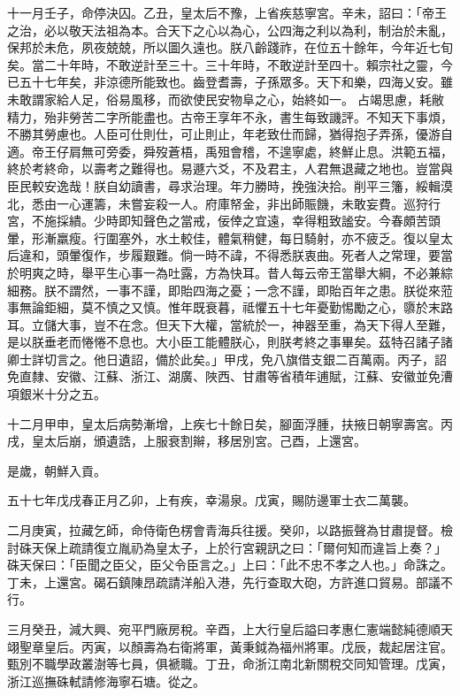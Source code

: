 \begin{pinyinscope}
十一月壬子，命停決囚。乙丑，皇太后不豫，上省疾慈寧宮。辛未，詔曰：「帝王之治，必以敬天法祖為本。合天下之心以為心，公四海之利以為利，制治於未亂，保邦於未危，夙夜兢兢，所以圖久遠也。朕八齡踐祚，在位五十餘年，今年近七旬矣。當二十年時，不敢逆計至三十。三十年時，不敢逆計至四十。賴宗社之靈，今已五十七年矣，非涼德所能致也。齒登耆壽，子孫眾多。天下和樂，四海乂安。雖未敢謂家給人足，俗易風移，而欲使民安物阜之心，始終如一。占竭思慮，耗敝精力，殆非勞苦二字所能盡也。古帝王享年不永，書生每致譏評。不知天下事煩，不勝其勞慮也。人臣可仕則仕，可止則止，年老致仕而歸，猶得抱子弄孫，優游自適。帝王仔肩無可旁委，舜歿蒼梧，禹殂會稽，不遑寧處，終鮮止息。洪範五福，終於考終命，以壽考之難得也。易遯六爻，不及君主，人君無退藏之地也。豈當與臣民較安逸哉！朕自幼讀書，尋求治理。年力勝時，挽強決拾。削平三籓，綏輯漠北，悉由一心運籌，未嘗妄殺一人。府庫帑金，非出師賑饑，未敢妄費。巡狩行宮，不施採繢。少時即知聲色之當戒，佞倖之宜遠，幸得粗致謐安。今春頗苦頭暈，形漸羸瘦。行圍塞外，水土較佳，體氣稍健，每日騎射，亦不疲乏。復以皇太后違和，頭暈復作，步履艱難。倘一時不諱，不得悉朕衷曲。死者人之常理，要當於明爽之時，舉平生心事一為吐露，方為快耳。昔人每云帝王當舉大綱，不必兼綜細務。朕不謂然，一事不謹，即貽四海之憂；一念不謹，即貽百年之患。朕從來蒞事無論鉅細，莫不慎之又慎。惟年既衰暮，祗懼五十七年憂勤惕勵之心，隳於末路耳。立儲大事，豈不在念。但天下大權，當統於一，神器至重，為天下得人至難，是以朕垂老而惓惓不息也。大小臣工能體朕心，則朕考終之事畢矣。茲特召諸子諸卿士詳切言之。他日遺詔，備於此矣。」甲戌，免八旗借支銀二百萬兩。丙子，詔免直隸、安徽、江蘇、浙江、湖廣、陜西、甘肅等省積年逋賦，江蘇、安徽並免漕項銀米十分之五。

十二月甲申，皇太后病勢漸增，上疾七十餘日矣，腳面浮腫，扶掖日朝寧壽宮。丙戌，皇太后崩，頒遺誥，上服衰割辮，移居別宮。己酉，上還宮。

是歲，朝鮮入貢。

五十七年戊戌春正月乙卯，上有疾，幸湯泉。戊寅，賜防邊軍士衣二萬襲。

二月庚寅，拉藏乞師，命侍衛色楞會青海兵往援。癸卯，以路振聲為甘肅提督。檢討硃天保上疏請復立胤礽為皇太子，上於行宮親訊之曰：「爾何知而違旨上奏？」硃天保曰：「臣聞之臣父，臣父令臣言之。」上曰：「此不忠不孝之人也。」命誅之。丁未，上還宮。碣石鎮陳昂疏請洋船入港，先行查取大砲，方許進口貿易。部議不行。

三月癸丑，減大興、宛平門廠房稅。辛酉，上大行皇后謚曰孝惠仁憲端懿純德順天翊聖章皇后。丙寅，以顏壽為右衛將軍，黃秉鉞為福州將軍。戊辰，裁起居注官。甄別不職學政叢澍等七員，俱褫職。丁丑，命浙江南北新關稅交同知管理。戊寅，浙江巡撫硃軾請修海寧石塘。從之。


\end{pinyinscope}
